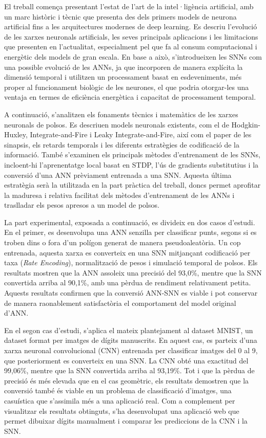 \documentclass[a4paper,11pt, titlepage, twoside]{article}
\begin{document}
El treball comença presentant l'estat de l'art de la intel·ligència artificial, amb un marc històric i tècnic que presenta des dels primers models de neurona artificial fins a les arquitectures modernes de deep learning. Es descriu l’evolució de les xarxes neuronals artificials, les seves principals aplicacions i les limitacions que presenten en l’actualitat, especialment pel que fa al consum computacional i energètic dels models de gran escala. En base a això, s’introdueixen les SNNs com una possible evolució de les ANNs, ja que incorporen de manera explícita la dimensió temporal i utilitzen un processament basat en esdeveniments, més proper al funcionament biològic de les neurones, el que podria otorgar-les una ventaja en termes de eficiència energètica i capacitat de processament temporal.

A continuació, s’analitzen els fonaments tècnics i matemàtics de les xarxes neuronals de polsos. Es descriuen models neuronals existents, com el de Hodgkin-Huxley, Integrate-and-Fire i Leaky Integrate-and-Fire, així com el paper de les sinapsis, els retards temporals i les diferents estratègies de codificació de la informació. També s’examinen els principals mètodes d’entrenament de les SNNs, incloent-hi l’aprenentatge local basat en STDP, l’ús de gradients substitutius i la conversió d’una ANN prèviament entrenada a una SNN. Aquesta última estratègia serà la utilitzada en la part pràctica del treball, doncs permet aprofitar la maduresa i relativa facilitat dels mètodes d’entrenament de les ANNs i traslladar els pesos apresos a un model de polsos.

La part experimental, exposada a continuació, es divideix en dos casos d’estudi. En el primer, es desenvolupa una ANN senzilla per classificar punts, segons si es troben dins o fora d’un polígon generat de manera pseudoaleatòria. Un cop entrenada, aquesta xarxa es converteix en una SNN mitjançant codificació per taxa (\textit{Rate Encoding}), normalització de pesos i simulació temporal de polsos. Els resultats mostren que la ANN assoleix una precisió del 93,0\%, mentre que la SNN convertida arriba al 90,1\%, amb una pèrdua de rendiment relativament petita. Aquests resultats confirmen que la conversió ANN-SNN es viable i pot conservar de manera raonablement satisfactòria el comportament del model original d'ANN.

En el segon cas d’estudi, s’aplica el mateix plantejament al dataset MNIST, un dataset format per imatges de dígits manuscrits. En aquest cas, es parteix d’una xarxa neuronal convolucional (CNN) entrenada per classificar imatges del 0 al 9, que posteriorment es converteix en una SNN. La CNN obté una exactitud del 99,06\%, mentre que la SNN convertida arriba al 93,19\%. Tot i que la pèrdua de precisió és més elevada que en el cas geomètric, els resultats demostren que la conversió també és viable en un problema de classificació d’imatges, una casuística que s'assimila més a una aplicació real. Com a complement per visualitzar els resultats obtinguts, s’ha desenvolupat una aplicació web que permet dibuixar dígits manualment i comparar les prediccions de la CNN i la SNN.
\end{document}
